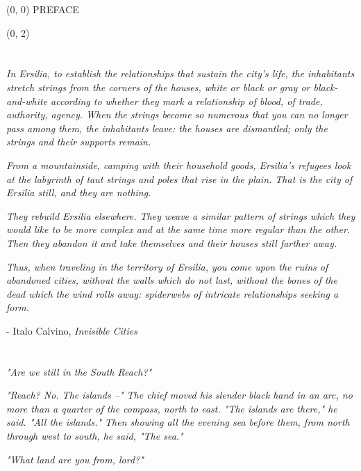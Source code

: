 \documentclass[10pt]{article}
\begin{document}
\begin{textblock}{23}(0, 0)
\center\huge PREFACE
\end{textblock}

\begin{textblock}{9}(0, 2)

\section{}

\textit{In Ersilia, to establish the relationships that sustain the city's
life, the inhabitants stretch strings from the corners of the houses, white or
black or gray or black-and-white according to whether they mark a relationship
of blood, of trade, authority, agency. When the strings become so numerous that
you can no longer pass among them, the inhabitants leave: the houses are
dismantled; only the strings and their supports remain.}

\textit{From a mountainside, camping with their household goods, Ersilia's
refugees look at the labyrinth of taut strings and poles that rise in the
plain. That is the city of Ersilia still, and they are nothing.}

\textit{They rebuild Ersilia elsewhere. They weave a similar pattern of strings
which they would like to be more complex and at the same time more regular than
the other. Then they abandon it and take themselves and their houses still
farther away.}

\textit{Thus, when traveling in the territory of Ersilia, you come upon the
ruins of abandoned cities, without the walls which do not last, without the
bones of the dead which the wind rolls away: spiderwebs of intricate
relationships seeking a form.}

- Italo Calvino, \emph{Invisible Cities}

\section{}

\textit{"Are we still in the South Reach?"}

\textit{"Reach? No. The islands --" The chief moved his slender black hand in
an arc, no more than a quarter of the compass, north to east. "The islands are
there," he said. "All the islands." Then showing all the evening sea before
them, from north through west to south, he said, "The sea."}

\textit{"What land are you from, lord?"}


\end{textblock}
\end{document}
